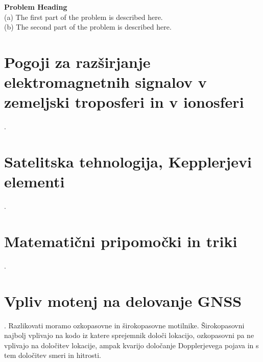 \begin{prob}
	\label{prob2}
	\textbf{Problem Heading}\\
	(a) The first part of the problem is described here.\\
	(b) The second part of the problem is described here.
\end{prob}

\section{Pogoji za razširjanje elektromagnetnih signalov v zemeljski troposferi in v ionosferi}
\label{sec:1}
\cite{monograph}.



\section{Satelitska tehnologija, Kepplerjevi elementi}
\label{sec:1}
\cite{monograph}.

\section{Matematični pripomočki in triki}
\label{sec:1}
\cite{monograph}.


\section{Vpliv motenj na delovanje GNSS}
\label{sec:1}
\cite{monograph}.
Razlikovati moramo ozkopasovne in širokopasovne motilnike. Širokopasovni najbolj vplivajo na kodo iz katere sprejemnik določi lokacijo, ozkopasovni pa ne vplivajo na določitev lokacije, ampak kvarijo določanje Dopplerjevega pojava in s tem določitev smeri in hitrosti.

%

